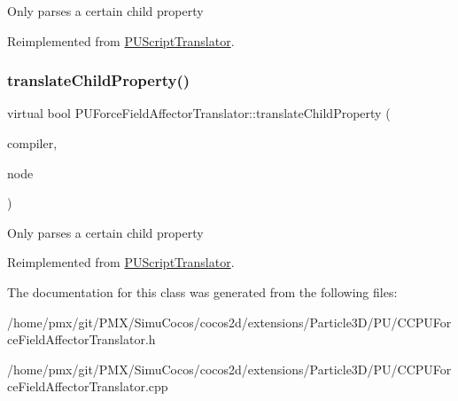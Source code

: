 Only parses a certain child property 

Reimplemented from \hyperlink{classPUScriptTranslator_a0374d83a8a04e57918975d525e0f8fe8}{P\+U\+Script\+Translator}.

\mbox{\label{classPUForceFieldAffectorTranslator_ad0aa1f0eb7ff0e7184d943e8568b718a}} 
\subsubsection{\texorpdfstring{translate\+Child\+Property()}{translateChildProperty()}\hspace{0.1cm}{\footnotesize\ttfamily [2/2]}}
{\footnotesize\ttfamily virtual bool P\+U\+Force\+Field\+Affector\+Translator\+::translate\+Child\+Property (\begin{DoxyParamCaption}\item[{\hyperlink{classPUScriptCompiler}{P\+U\+Script\+Compiler} $\ast$}]{compiler,  }\item[{\hyperlink{classPUAbstractNode}{P\+U\+Abstract\+Node} $\ast$}]{node }\end{DoxyParamCaption})\hspace{0.3cm}{\ttfamily [virtual]}}

Only parses a certain child property 

Reimplemented from \hyperlink{classPUScriptTranslator_a0374d83a8a04e57918975d525e0f8fe8}{P\+U\+Script\+Translator}.



The documentation for this class was generated from the following files\+:\begin{DoxyCompactItemize}
\item 
/home/pmx/git/\+P\+M\+X/\+Simu\+Cocos/cocos2d/extensions/\+Particle3\+D/\+P\+U/C\+C\+P\+U\+Force\+Field\+Affector\+Translator.\+h\item 
/home/pmx/git/\+P\+M\+X/\+Simu\+Cocos/cocos2d/extensions/\+Particle3\+D/\+P\+U/C\+C\+P\+U\+Force\+Field\+Affector\+Translator.\+cpp\end{DoxyCompactItemize}
